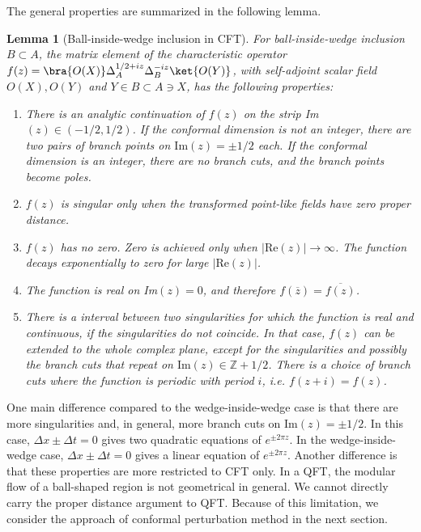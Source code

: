 \documentclass[a4paper,11pt]{article}
\newtheorem{lemma}[theorem]{Lemma}
\theoremstyle{definition}
\theoremstyle{remark}
\begin{document}
The general properties are summarized in the following lemma.
\begin{lemma} [Ball-inside-wedge inclusion in CFT]
    For ball-inside-wedge inclusion $B\subset A$, the matrix element of the characteristic operator $f(z) = \bra{O(X)}\Delta_A^{1/2+iz}\Delta_B^{-iz}\ket{O(Y)}$, with self-adjoint scalar field $O(X), O(Y)$ and $Y\in B \subset A \ni X$, has the following properties:
    \begin{enumerate}
        \item There is an analytic continuation of $f(z)$ on the strip Im$(z)\in (-1/2,1/2)$. If the conformal dimension is not an integer, there are two pairs of branch points on $\text{Im}(z)=\pm1/2$ each. If the conformal dimension is an integer, there are no branch cuts, and the branch points become poles.
        \item $f(z)$ is singular only when the transformed point-like fields have zero proper distance.
        \item $f(z)$ has no zero. Zero is achieved only when $|\text{Re}(z)| \to \infty$. The function decays exponentially to zero for large $|\text{Re}(z)|$.
        \item The function is real on Im$(z) = 0$, and therefore $f(\overline{z}) = \overline{f(z)}$.
        \item There is a interval between two singularities for which the function is real and continuous, if the singularities do not coincide. In that case, $f(z)$ can be extended to the whole complex plane, except for the singularities and possibly the branch cuts that repeat on $\text{Im}(z) \in \mathbb{Z} +1/2$. There is a choice of branch cuts where the function is periodic with period $i$, i.e. $f(z+i)=f(z)$. 
    \end{enumerate}
\end{lemma}
One main difference compared to the wedge-inside-wedge case is that there are more singularities and, in general, more branch cuts on $\text{Im}(z) = \pm 1/2$. In this case, $\Delta x \pm \Delta t = 0$ gives two quadratic equations of $e^{\pm 2\pi z}$. In the wedge-inside-wedge case, $\Delta x \pm \Delta t = 0$ gives a linear equation of $e^{\pm2\pi z}$. Another difference is that these properties are more restricted to CFT only. In a QFT, the modular flow of a ball-shaped region is not geometrical in general. We cannot directly carry the proper distance argument to QFT. Because of this limitation, we consider the approach of conformal perturbation method in the next section.
\end{document}
